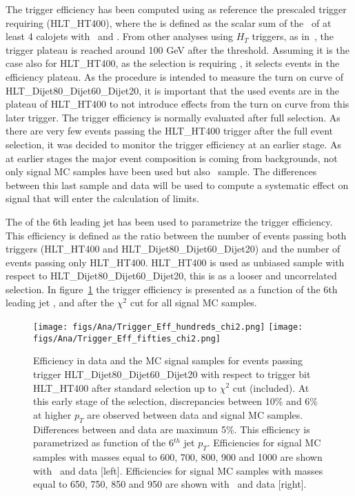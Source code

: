 The trigger efficiency has been computed using as reference the prescaled trigger requiring  (HLT\_HT400), where the \HT is defined as the scalar sum of the \pt~of at least 4 calojets with ~and . From other analyses using $H_{T}$ triggers, as in~\cite{Khachatryan:2015axa}, the trigger plateau is reached around 100 GeV after the threshold. Assuming it is the case also for HLT\_HT400, as the selection is requiring , it selects events in the efficiency plateau. As the procedure is intended to measure the turn on curve of HLT\_Dijet80\_Dijet60\_Dijet20, it is important that the used events are in the plateau of HLT\_HT400 to not introduce effects from the turn on curve from this later trigger. The trigger efficiency is normally evaluated after full selection. As there are very few events passing the HLT\_HT400 trigger after the full event selection, it was decided to monitor the trigger efficiency at an earlier stage. As at earlier stages the major event composition is coming from backgrounds, not only signal MC samples have been used but also \ttbar~sample. The differences between this last sample and data will be used to compute a systematic effect on signal that will enter the calculation of limits.

The \pt of the 6th leading jet has been used to parametrize the trigger efficiency. This efficiency is defined as the ratio between the number of events passing both triggers (HLT\_HT400 and HLT\_Dijet80\_Dijet60\_Dijet20) and the number of events passing only HLT\_HT400. HLT\_HT400 is used as unbiased sample with respect to HLT\_Dijet80\_Dijet60\_Dijet20, this is as a looser and uncorrelated selection. In figure~\ref{fig:TrigEff} the trigger efficiency is presented as a function of the 6th leading jet \pt, and after the $\chi^{2}$ cut for all signal MC samples. 

\begin{figure}[!Hhtbp]
  \begin{center}
    \texttt{[image: figs/Ana/Trigger\_Eff\_hundreds\_chi2.png]}
    \texttt{[image: figs/Ana/Trigger\_Eff\_fifties\_chi2.png]}
    \caption{Efficiency in data and the MC signal samples for events passing trigger HLT\_Dijet80\_Dijet60\_Dijet20 with respect to trigger bit HLT\_HT400 after standard selection up to $\chi^{2}$ cut (included). At this early stage of the selection, discrepancies between 10\% and 6\% at higher $p_{T}$ are observed between data and signal MC samples. Differences between \ttbar and data are maximum 5\%. This efficiency is parametrized as function of the 6$^{th}$ jet $p_{T}$. Efficiencies for signal MC samples with \Tp masses equal to 600, 700, 800, 900 and 1000 \GeVcc are shown with \ttbar~and data [left]. Efficiencies for signal MC samples with \Tp masses equal to 650, 750, 850 and 950 \GeVcc are shown with \ttbar~and data [right].}
    \label{fig:TrigEff}
  \end{center}
\end{figure}

